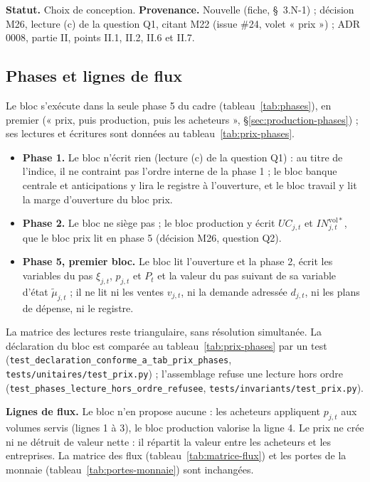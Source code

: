\documentclass[11pt,a4paper]{article}
\begin{document}
\textbf{Statut.} Choix de conception. \textbf{Provenance.} Nouvelle (fiche, \S~3.N-1) ; décision M26, lecture (c) de la question Q1, citant M22 (issue \#24, volet « prix ») ; ADR 0008, partie II, points II.1, II.2, II.6 et II.7.

\subsection{Phases et lignes de flux}
\label{sec:prix-phases}
Le bloc s'exécute dans la seule phase 5 du cadre (tableau~\ref{tab:phases}), en premier (« prix, puis production, puis les acheteurs », \S\ref{sec:production-phases}) ; ses lectures et écritures sont données au tableau~\ref{tab:prix-phases}.
\begin{itemize}
\item \textbf{Phase 1.} Le bloc n'écrit rien (lecture (c) de la question Q1) : au titre de l'indice, il ne contraint pas l'ordre interne de la phase 1 ; le bloc banque centrale et anticipations y lira le registre à l'ouverture, et le bloc travail y lit la marge d'ouverture du bloc prix.
\item \textbf{Phase 2.} Le bloc ne siège pas ; le bloc production y écrit $\mathit{UC}_{j,t}$ et $\mathit{IN}^{\mathrm{vol}\ast}_{j,t}$, que le bloc prix lit en phase 5 (décision M26, question Q2).
\item \textbf{Phase 5, premier bloc.} Le bloc lit l'ouverture et la phase 2, écrit les variables du pas $\xi_{j,t}$, $p_{j,t}$ et $P_t$ et la valeur du pas suivant de sa variable d'état $\tilde\mu_{j,t}$ ; il ne lit ni les ventes $v_{j,t}$, ni la demande adressée $d_{j,t}$, ni les plans de dépense, ni le registre.
\end{itemize}
La matrice des lectures reste triangulaire, sans résolution simultanée. La déclaration du bloc est comparée au tableau~\ref{tab:prix-phases} par un test (\nolinkurl{test_declaration_conforme_a_tab_prix_phases}, \nolinkurl{tests/unitaires/test_prix.py}) ; l'assemblage refuse une lecture hors ordre (\nolinkurl{test_phases_lecture_hors_ordre_refusee}, \nolinkurl{tests/invariants/test_prix.py}).

\textbf{Lignes de flux.} Le bloc n'en propose aucune : les acheteurs appliquent $p_{j,t}$ aux volumes servis (lignes 1 à 3), le bloc production valorise la ligne 4. Le prix ne crée ni ne détruit de valeur nette : il répartit la valeur entre les acheteurs et les entreprises. La matrice des flux (tableau~\ref{tab:matrice-flux}) et les portes de la monnaie (tableau~\ref{tab:portes-monnaie}) sont inchangées.
\end{document}
